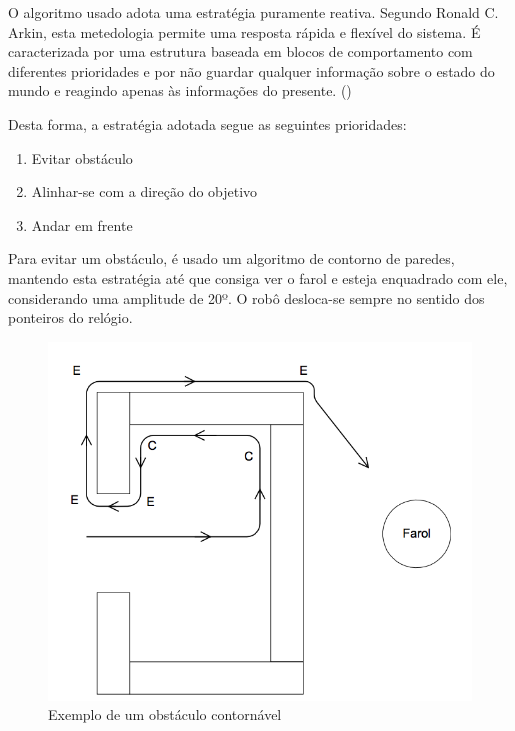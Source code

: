 \documentclass[citeauthoryear]{llncs} %
\begin{document}
O algoritmo usado adota uma estratégia puramente reativa. Segundo Ronald C. Arkin, esta metedologia permite uma resposta rápida e flexível do sistema. É caracterizada por uma estrutura baseada em blocos de comportamento com diferentes prioridades e por não guardar qualquer informação sobre o estado do mundo e reagindo apenas às informações do presente. (\cite{arkin})

Desta forma, a estratégia adotada segue as seguintes prioridades:

\begin{enumerate}
\item Evitar obstáculo
\item Alinhar-se com a direção do objetivo
\item Andar em frente
\end{enumerate}

Para evitar um obstáculo, é usado um algoritmo de contorno de paredes, mantendo esta estratégia até que consiga ver o farol e esteja enquadrado com ele, considerando uma amplitude de 20º. O robô desloca-se sempre no sentido dos ponteiros do relógio.   

\begin{figure}[htb]
\begin{center}
\includegraphics[scale=0.30]{fig1.png}
\caption{Exemplo de um obstáculo contornável}
\end{center}
\end{figure}
\end{document}
